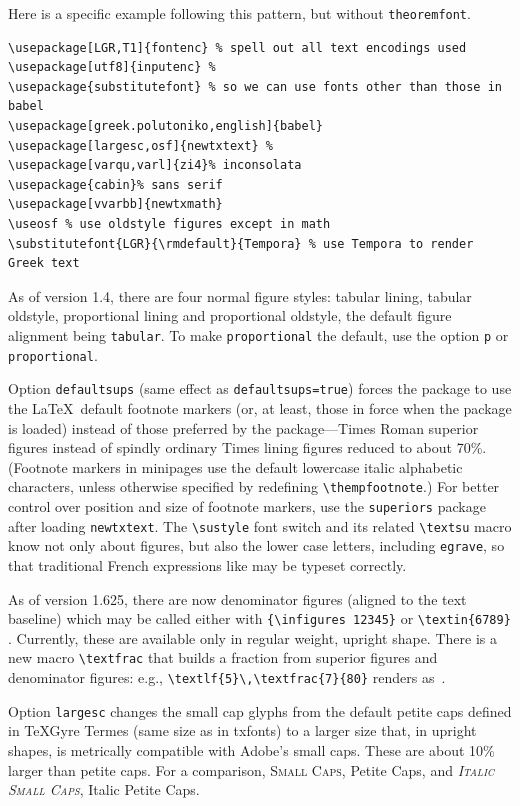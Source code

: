 \documentclass[11pt]{article}
\theoremstyle{oldplain}
\theoremstyle{plain}
\begin{document}
Here is a specific example following this pattern, but without {\tt theoremfont}.
\begin{verbatim}
\usepackage[LGR,T1]{fontenc} % spell out all text encodings used
\usepackage[utf8]{inputenc} % 
\usepackage{substitutefont} % so we can use fonts other than those in babel
\usepackage[greek.polutoniko,english]{babel}
\usepackage[largesc,osf]{newtxtext} % 
\usepackage[varqu,varl]{zi4}% inconsolata
\usepackage{cabin}% sans serif
\usepackage[vvarbb]{newtxmath}
\useosf % use oldstyle figures except in math
\substitutefont{LGR}{\rmdefault}{Tempora} % use Tempora to render Greek text
\end{verbatim}

As of version 1.4, there are four normal figure styles: tabular lining, tabular oldstyle, proportional lining and proportional oldstyle, the default figure alignment being \texttt{tabular}. To make \texttt{proportional} the default, use the option \texttt{p} or \texttt{proportional}.

Option {\tt defaultsups} (same effect as {\tt defaultsups=true}) forces the package to use the \LaTeX\ default footnote markers (or, at least, those in force when the package is loaded) instead of those preferred by the package---Times Roman superior figures instead of spindly ordinary Times lining figures reduced to about 70\%. (Footnote markers in minipages use the default lowercase italic alphabetic characters, unless otherwise specified by redefining \verb|\thempfootnote|.) For better control over position and size of footnote markers, use the {\tt superiors} package after loading {\tt newtxtext}. The \verb|\sustyle| font switch and its related \verb|\textsu| macro know not only about figures, but also the lower case letters, including \texttt{egrave}, so that traditional French expressions like  may be typeset correctly.

As of version 1.625, there are now denominator figures (aligned to the text baseline) which may be called either with \verb|{\infigures 12345}| {} or \verb|\textin{6789}| . Currently, these are available only in regular weight, upright shape. There is a new macro \verb|\textfrac| that builds a fraction from superior figures and denominator figures: e.g., \verb|\textlf{5}\,\textfrac{7}{80}| renders as \,.

Option \texttt{largesc} changes the small cap glyphs from the default petite caps defined in TeXGyre Termes (same size as in txfonts) to a larger size that, in upright shapes, is metrically compatible with Adobe's small caps. These are about 10\% larger than petite caps. For a comparison, \textsc{Small Caps}, {Petite Caps}, and \textsc{\textit{Italic Small Caps}}, {Italic Petite Caps}.
\end{document}
